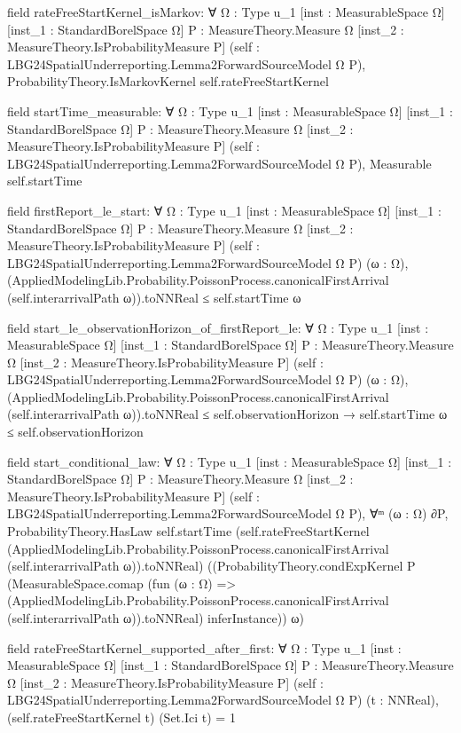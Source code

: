 \documentclass[10pt]{article}
\begin{document}
\begin{ReviewVerbatim}
field rateFreeStartKernel_isMarkov:
∀ {Ω : Type u_1} [inst : MeasurableSpace Ω] [inst_1 : StandardBorelSpace Ω] {P : MeasureTheory.Measure Ω}
  [inst_2 : MeasureTheory.IsProbabilityMeasure P] (self : LBG24SpatialUnderreporting.Lemma2ForwardSourceModel Ω P),
  ProbabilityTheory.IsMarkovKernel self.rateFreeStartKernel

field startTime_measurable:
∀ {Ω : Type u_1} [inst : MeasurableSpace Ω] [inst_1 : StandardBorelSpace Ω] {P : MeasureTheory.Measure Ω}
  [inst_2 : MeasureTheory.IsProbabilityMeasure P] (self : LBG24SpatialUnderreporting.Lemma2ForwardSourceModel Ω P),
  Measurable self.startTime

field firstReport_le_start:
∀ {Ω : Type u_1} [inst : MeasurableSpace Ω] [inst_1 : StandardBorelSpace Ω] {P : MeasureTheory.Measure Ω}
  [inst_2 : MeasureTheory.IsProbabilityMeasure P] (self : LBG24SpatialUnderreporting.Lemma2ForwardSourceModel Ω P)
  (ω : Ω),
  (AppliedModelingLib.Probability.PoissonProcess.canonicalFirstArrival (self.interarrivalPath ω)).toNNReal ≤
    self.startTime ω

field start_le_observationHorizon_of_firstReport_le:
∀ {Ω : Type u_1} [inst : MeasurableSpace Ω] [inst_1 : StandardBorelSpace Ω] {P : MeasureTheory.Measure Ω}
  [inst_2 : MeasureTheory.IsProbabilityMeasure P] (self : LBG24SpatialUnderreporting.Lemma2ForwardSourceModel Ω P)
  (ω : Ω),
  (AppliedModelingLib.Probability.PoissonProcess.canonicalFirstArrival (self.interarrivalPath ω)).toNNReal ≤
      self.observationHorizon →
    self.startTime ω ≤ self.observationHorizon

field start_conditional_law:
∀ {Ω : Type u_1} [inst : MeasurableSpace Ω] [inst_1 : StandardBorelSpace Ω] {P : MeasureTheory.Measure Ω}
  [inst_2 : MeasureTheory.IsProbabilityMeasure P] (self : LBG24SpatialUnderreporting.Lemma2ForwardSourceModel Ω P),
  ∀ᵐ (ω : Ω) ∂P,
    ProbabilityTheory.HasLaw self.startTime
      (self.rateFreeStartKernel
        (AppliedModelingLib.Probability.PoissonProcess.canonicalFirstArrival (self.interarrivalPath ω)).toNNReal)
      ((ProbabilityTheory.condExpKernel P
          (MeasurableSpace.comap
            (fun (ω : Ω) =>
              (AppliedModelingLib.Probability.PoissonProcess.canonicalFirstArrival (self.interarrivalPath ω)).toNNReal)
            inferInstance))
        ω)

field rateFreeStartKernel_supported_after_first:
∀ {Ω : Type u_1} [inst : MeasurableSpace Ω] [inst_1 : StandardBorelSpace Ω] {P : MeasureTheory.Measure Ω}
  [inst_2 : MeasureTheory.IsProbabilityMeasure P] (self : LBG24SpatialUnderreporting.Lemma2ForwardSourceModel Ω P)
  (t : NNReal), (self.rateFreeStartKernel t) (Set.Ici t) = 1


\end{ReviewVerbatim}
\end{document}
